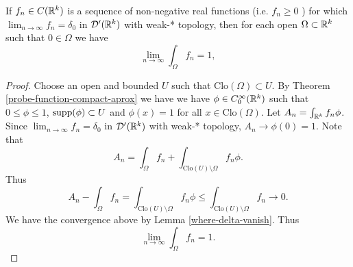 \documentclass[main.tex]{subfiles}
\begin{document}
\begin{lemma}
If $f_n\in C(\mathbb{R}^k)$ is a sequence of non-negative real functions (i.e. $f_n \geq 0$ ) for which 
$\lim_{n\to\infty} f_n = \delta_0$ in $\mathcal{D}'(\mathbb{R}^k)$ with weak-* topology, then for each open $\Omega\subset \mathbb{R}^k$ such that $0\in\Omega$ we have
\begin{equation}
\lim_{n\to\infty}\int_{\Omega} f_n = 1,
\end{equation} 
\end{lemma}
\begin{proof}
Choose an open and bounded $U$ such that $\text{Clo}(\Omega)\subset U$.
By Theorem \ref{probe-function-compact-aprox} we have we have $\phi\in C^\infty_0(\mathbb{R}^k)$ such that $0 \leq \phi \leq 1$, $\text{supp}(\phi)\subset U$ and $\phi(x) = 1$ for all $x\in \text{Clo}(\Omega)$.
Let $A_n = \int_{\mathbb{R}^k}f_n \phi$. Since $\lim_{n\to\infty} f_n = \delta_0$ in $\mathcal{D}'(\mathbb{R}^k)$ with weak-* topology, $A_n\to \phi(0)=1$.
Note that
\begin{equation}
A_n = \int_\Omega f_n + \int_{\text{Clo}(U) \setminus \Omega} f_n \phi.
\end{equation}
Thus
\begin{equation}
A_n - \int_\Omega f_n = \int_{\text{Clo}(U) \setminus \Omega} f_n \phi \leq \int_{\text{Clo}(U) \setminus \Omega} f_n \to 0.
\end{equation}
We have the convergence above by Lemma \ref{where-delta-vanish}.
Thus
\begin{equation}
\lim_{n\to\infty}\int_{\Omega} f_n = 1.
\end{equation}
\end{proof}
\end{document}
